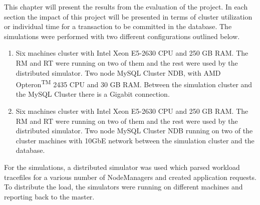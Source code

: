 This chapter will present the results from the evaluation
of the project. In each section the impact of this project will be
presented in terms of cluster utilization or individual time
for a transaction to be committed in the database. The simulations were
performed with two different configurations outlined below.

\begin{enumerate}
\item Six machines cluster with Intel\textsuperscript{\textregistered}
  Xeon \textsuperscript{\textregistered} E5-2630 CPU and 250 GB
  RAM. The RM and RT were running on two of them and the rest were
  used by the distributed simulator. Two node MySQL Cluster NDB, with
  AMD Opteron\textsuperscript{TM} 2435 CPU and 30 GB RAM. Between the
  simulation cluster and the MySQL Cluster there is a Gigabit connection.

\item Six machines cluster with Intel\textsuperscript{\textregistered}
  Xeon \textsuperscript{\textregistered} E5-2630 CPU and 250 GB
  RAM. The RM and RT were running on two of them and the rest were
  used by the distributed simulator. Two node MySQL Cluster NDB
  running on two of the cluster machines with 10GbE network between
  the simulation cluster and the database.

\end{enumerate}

For the simulations, a distributed simulator was used which parsed
workload tracefiles for a various number of NodeManagers and created
application requests. To distribute the load, the simulators were
running on different machines and reporting back to the master.